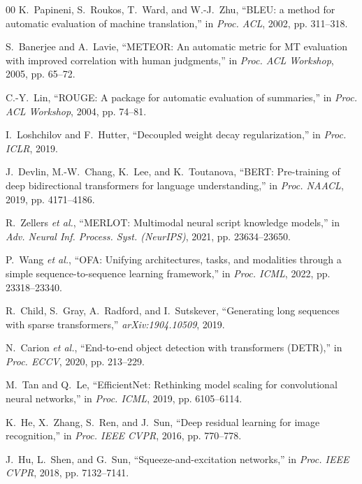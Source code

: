 \documentclass[conference]{IEEEtran}
\begin{document}
\begin{thebibliography}{00}
K.~Papineni, S.~Roukos, T.~Ward, and W.-J.~Zhu, ``BLEU: a method for automatic evaluation of machine translation,'' in \emph{Proc. ACL}, 2002, pp. 311--318.

S.~Banerjee and A.~Lavie, ``METEOR: An automatic metric for MT evaluation with improved correlation with human judgments,'' in \emph{Proc. ACL Workshop}, 2005, pp. 65--72.

C.-Y.~Lin, ``ROUGE: A package for automatic evaluation of summaries,'' in \emph{Proc. ACL Workshop}, 2004, pp. 74--81.

I.~Loshchilov and F.~Hutter, ``Decoupled weight decay regularization,'' in \emph{Proc. ICLR}, 2019.

J.~Devlin, M.-W.~Chang, K.~Lee, and K.~Toutanova, ``BERT: Pre-training of deep bidirectional transformers for language understanding,'' in \emph{Proc. NAACL}, 2019, pp. 4171--4186.

R.~Zellers \emph{et al.}, ``MERLOT: Multimodal neural script knowledge models,'' in \emph{Adv. Neural Inf. Process. Syst. (NeurIPS)}, 2021, pp. 23634--23650.

P.~Wang \emph{et al.}, ``OFA: Unifying architectures, tasks, and modalities through a simple sequence-to-sequence learning framework,'' in \emph{Proc. ICML}, 2022, pp. 23318--23340.

R.~Child, S.~Gray, A.~Radford, and I.~Sutskever, ``Generating long sequences with sparse transformers,'' \emph{arXiv:1904.10509}, 2019.

N.~Carion \emph{et al.}, ``End-to-end object detection with transformers (DETR),'' in \emph{Proc. ECCV}, 2020, pp. 213--229.

M.~Tan and Q.~Le, ``EfficientNet: Rethinking model scaling for convolutional neural networks,'' in \emph{Proc. ICML}, 2019, pp. 6105--6114.

K.~He, X.~Zhang, S.~Ren, and J.~Sun, ``Deep residual learning for image recognition,'' in \emph{Proc. IEEE CVPR}, 2016, pp. 770--778.

J.~Hu, L.~Shen, and G.~Sun, ``Squeeze-and-excitation networks,'' in \emph{Proc. IEEE CVPR}, 2018, pp. 7132--7141.

\end{thebibliography}
\end{document}
